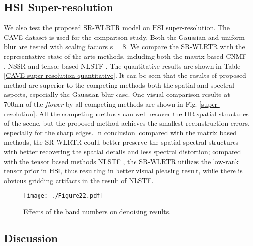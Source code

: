 \documentclass[twocolumn]{svjour3}          %
\begin{document}
  \subsection{HSI Super-resolution}
    We also test the proposed SR-WLRTR model on HSI super-resolution. The CAVE dataset is used for the comparison study. Both the Gaussian and uniform blur are tested with scaling factors s = 8. We compare the SR-WLRTR with the representative state-of-the-arts methods, including both the matrix based CNMF \cite{yokoya2012coupled}, NSSR \cite{dong2016hyperspectral} and tensor based NLSTF \cite{dian2017hyperspectral}. The quantitative results are shown in Table \ref{CAVE super-resolution quantitative}. It can be seen that the results of proposed method are superior to the competing methods both the spatial and spectral aspects, especially the Gaussian blur case. One visual comparison results at 700nm of the \emph{flower} by all competing methods are shown in Fig. \ref{super-resolution}. All the competing methods can well recover the HR spatial structures of the scene, but the proposed method achieves the smallest reconstruction errors, especially for the sharp edges. In conclusion, compared with the matrix based methods, the SR-WLRTR could better preserve the spatial-spectral structures with better recovering the spatial details and less spectral distortion; compared with the tensor based methods NLSTF \cite{dian2017hyperspectral}, the SR-WLRTR utilizes the low-rank tensor prior in HSI, thus resulting in
    better visual pleasing result, while there is obvious gridding artifacts in the result of NLSTF.


\begin{figure}
\begin{center}
    \texttt{[image: ./Figure22.pdf]}
\end{center}
   \caption{Effects of the band numbers on denoising results.}
\label{Number of Bands}
\end{figure}


\subsection{Discussion}
\end{document}
